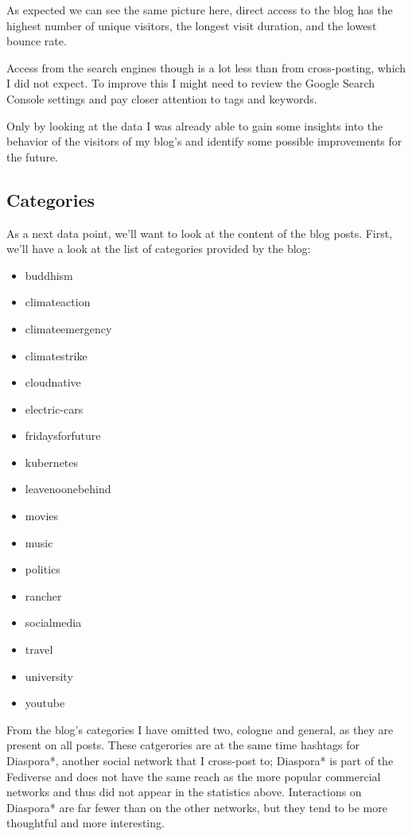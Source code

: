 As expected we can see the same picture here, direct access to the blog has the highest number of unique visitors, the longest visit duration, and the lowest bounce rate.

Access from the search engines though is a lot less than from cross-posting, which I did not expect. To improve this I might need to review the Google Search Console settings and pay closer attention to tags and keywords.

Only by looking at the data I was already able to gain some insights into the behavior of the visitors of my blog's and identify some possible improvements for the future.

\subsection{Categories}

As a next data point, we'll want to look at the content of the blog posts. First, we'll have a look at the list of categories provided by the blog:

\begin{itemize}
\item buddhism
\item climateaction
\item climateemergency
\item climatestrike
\item cloudnative
\item electric-cars
\item fridaysforfuture
\item kubernetes
\item leavenoonebehind
\item movies
\item music
\item politics
\item rancher
\item socialmedia
\item travel
\item university
\item youtube
\end{itemize}

From the blog's categories I have omitted two, cologne and general, as they are present on all posts. These catgerories are at the same time hashtags for Diaspora*, another social network that I cross-post to; Diaspora* is part of the Fediverse and does not have the same reach as the more popular commercial networks and thus did not appear in the statistics above. Interactions on Diaspora* are far fewer than on the other networks, but they tend to be more thoughtful and more interesting.


